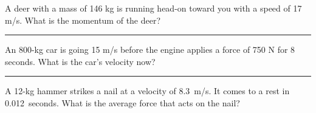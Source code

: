 \documentclass[12pt]{exam}
\begin{document}
\Large

\def\mystrut{\protect\rule[-2.2ex]{0ex}{2.2ex}} 
\qformat{ \textbf{Task \#\thequestion}
  \mystrut  \hfill}


\begin{questions}


\question
A deer with a mass of 146 kg is running head-on toward you with a speed of 17 m/s. What is the momentum of the deer?

\vs \hrule \vs

\question
An 800-kg car is going 15 m/s before the engine applies a force of 750 N for 8 seconds.  What is the car's velocity now?

\vs \hrule \vs

\question
A 12-kg hammer strikes a nail at a velocity of 8.3~m/s.  It comes to a rest in 0.012~seconds.  What is the average force that acts on the nail?

  \vs 




\end{questions}
\end{document}
